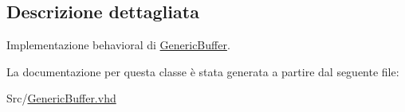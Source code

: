 \subsection{Descrizione dettagliata}
Implementazione behavioral di \hyperlink{class_generic_buffer}{Generic\+Buffer}. 

La documentazione per questa classe è stata generata a partire dal seguente file\+:\begin{DoxyCompactItemize}
\item 
Src/\hyperlink{_generic_buffer_8vhd}{Generic\+Buffer.\+vhd}\end{DoxyCompactItemize}
